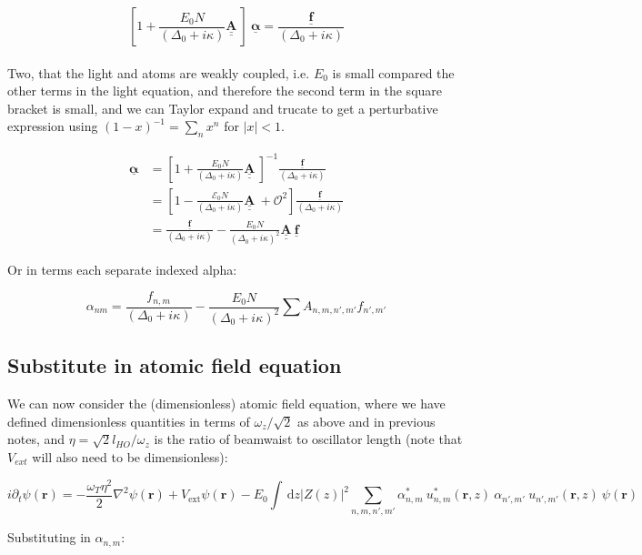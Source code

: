 \documentclass[a4paper,nobalancelastpage]{revtex4-1}
\newcommand{\vect}[1]{\bm{#1}}
\newcommand{\uvect}[1]{\bm{\underline{#1}}}
\newcommand{\umat}[1]{\bm{\underline{\underline{#1}}}}
\newcommand{\abs}[1]{\lvert #1 \rvert}
\begin{document}
\begin{equation}
\left[1 + \frac{E_0 N}{(\Delta_0+i\kappa) } \umat{A} \ \right] \ \uvect{\alpha} = \frac{\uvect{f}}{(\Delta_0+i\kappa) }
\end{equation}
\\
Two, that the light and atoms are weakly coupled, i.e. $E_0$ is small compared the other terms in the light equation, and therefore the second term in the square bracket is small, and we can Taylor expand and trucate to get a perturbative expression using $(1-x)^{-1}=\sum_n x^n$ for $\abs{x}<1$.

\begin{align}
\uvect{\alpha} &= \left[1 + \frac{E_0 N}{(\Delta_0+i\kappa) } \umat{A} \ \right]^{-1} \frac{\uvect{f}}{(\Delta_0+i\kappa) }
\\ & = \left[1 - \frac{\mathcal{E}_0 N}{(\Delta_0+i\kappa) } \umat{A} \ +\mathcal{O}^2 \right] \frac{\uvect{f}}{(\Delta_0+i\kappa) } \\ &=
 \frac{\uvect{f}}{(\Delta_0+i\kappa)} -  \frac{E_0 N}{(\Delta_0+i\kappa)^2 } \umat{A} \ \uvect{f}
\end{align}

Or in terms each separate indexed alpha:

\begin{equation}
\alpha_{nm}= \frac{f_{n,m}}{(\Delta_0+i\kappa)} -  \frac{E_0 N}{(\Delta_0+i\kappa)^2 } \sum A_{n,m,n',m'} f_{n',m'}
\end{equation}

\subsection{Substitute in atomic field equation}

We can now consider the (dimensionless) atomic field equation, where we have defined dimensionless quantities in terms of $\omega_z/\sqrt{2}$ as above and in previous notes, and $\eta=\sqrt{2}l_{HO}/\omega_z$ is the ratio of beamwaist to oscillator length (note that $V_{ext}$ will also need to be dimensionless):

\begin{equation}
\label{eq:eqnpsifirst}
i \partial_t \psi(\vect{r})= -\frac{\omega_T \eta^2}{2}\nabla^2 \psi(\vect{r})+ V_{\text{ext}} \psi(\vect{r}) - E_0 
\int \, \mathrm{d}z |Z(z)|^2 \sum_{n,m,n',m'} \alpha_{n,m}^* \ u_{n,m}^* (\vect{r},z)\ \alpha_{n',m'} \ u_{n',m'}(\vect{r},z) \ \psi(\vect{r})
\end{equation}

Substituting in $\alpha_{n,m}$:
  
\end{document}
